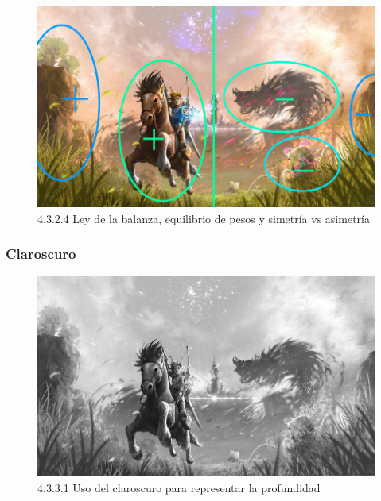 \documentclass[12pt]{article}
\begin{document}
    \begin{figure}[H]
      \centering
      \includegraphics[scale=0.7]{images/Saúl/Sección 17/EA_img17_2Composicion_4LeyBalanza-Simetria.png}
      \caption{\small 4.3.2.4 Ley de la balanza, equilibrio de pesos y simetría vs asimetría}
    \end{figure}





        \subsubsection{Claroscuro}

        
    \begin{figure}[H]
      \centering
      \includegraphics[scale=0.7]{images/Saúl/Sección 17/EA_img17_3Claroscuro_1Profundidad.png}
      \caption{\small 4.3.3.1 Uso del claroscuro para representar la profundidad}
    \end{figure}
\end{document}
